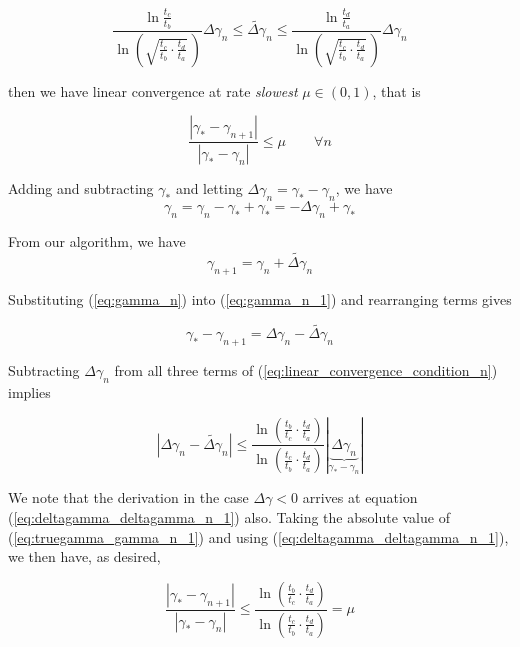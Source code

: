 \documentclass{segabs}
\newcommand{\truegamma}{\gamma_*}
\newcommand{\deltagamma}{{\Delta\gamma}}
\newcommand{\deltagammaguess}{{\widetilde{\deltagamma}}}
\newcommand{\scalefactor}{\ln \left(\sqrt{\frac{t_c}{t_b}\cdot\frac{t_d}{t_a}} \,\right) }
\newcommand{\rateofconvergence}{ \frac{\ln \left(\frac{t_b}{t_c}\cdot \frac{t_d}{t_a} \right)}{\ln \left(\frac{t_c}{t_b}\cdot \frac{t_d}{t_a} \right)}}
\begin{document}
\begin{equation}
\label{eq:linear_convergence_condition_n}
 \frac{\ln\frac{t_c}{t_b}}{\scalefactor} \deltagamma_n \leq \deltagammaguess_n \leq \frac{\ln\frac{t_d}{t_a}}{\scalefactor} \deltagamma_n\end{equation}


then we have linear convergence at rate \emph{slowest} $\mu \in (0,1)$, that is 

\begin{equation}
\frac{|\truegamma - \gamma_{n+1}|}{|\truegamma - \gamma_{n}|} \leq \mu \quad \quad \forall n 
\end{equation}

Adding and subtracting $\truegamma$ and letting $\deltagamma_n =\truegamma - \gamma_n$, we have
\begin{equation}
\label{eq:gamma_n}
\gamma_n = \gamma_n - \truegamma + \truegamma = -\deltagamma_n + \truegamma
\end{equation}

From our algorithm, we have
\begin{equation}
\label{eq:gamma_n_1}
\gamma_{n+1} = \gamma_n + \deltagammaguess_n
\end{equation}

Substituting (\ref{eq:gamma_n}) into (\ref{eq:gamma_n_1}) and rearranging terms gives

\begin{equation}
\label{eq:truegamma_gamma_n_1}
\truegamma - \gamma_{n+1} = \deltagamma_n - \deltagammaguess_n
\end{equation}

Subtracting $\deltagamma_n$ from all three terms of (\ref{eq:linear_convergence_condition_n}) implies

\begin{equation}
\label{eq:deltagamma_deltagamma_n_1}
|\deltagamma_n - \deltagammaguess_n| \leq \rateofconvergence |\underbrace{\deltagamma_n}_{\truegamma - \gamma_n}|
\end{equation}

We note that the derivation in the case $\deltagamma <0$ arrives at equation (\ref{eq:deltagamma_deltagamma_n_1}) also.   Taking the absolute value of (\ref{eq:truegamma_gamma_n_1}) and using (\ref{eq:deltagamma_deltagamma_n_1}), we then have, as desired,

\begin{equation}
\label{eq:convergence_rate}
\frac{|\truegamma - \gamma_{n+1}|}{|\truegamma - \gamma_{n}|} \leq \rateofconvergence = \mu
\end{equation}
\end{document}
